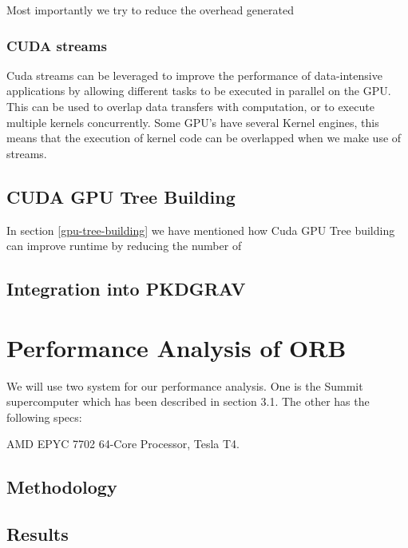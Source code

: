 \documentclass[]{article}
\begin{document}
Most importantly we try to reduce the overhead generated 

\subsubsection{CUDA streams}

Cuda streams can be leveraged to improve the performance of data-intensive applications by allowing different tasks to be executed in parallel on the GPU. This can be used to overlap data transfers with computation, or to execute multiple kernels concurrently. Some GPU's have several Kernel engines, this means that the execution of kernel code can be overlapped when we make use of streams.

\subsection{CUDA GPU Tree Building}

In section \ref{gpu-tree-building} we have mentioned how Cuda GPU Tree building can improve runtime by reducing the number of 
\newpage
\subsection{Integration into PKDGRAV}



\newpage
\section{Performance Analysis of ORB}

We will use two system for our performance analysis. One is the Summit supercomputer which has been described in section 3.1. The other has the following specs:


AMD EPYC 7702 64-Core Processor, Tesla T4.


\subsection{Methodology}

\subsection{Results}
\end{document}
